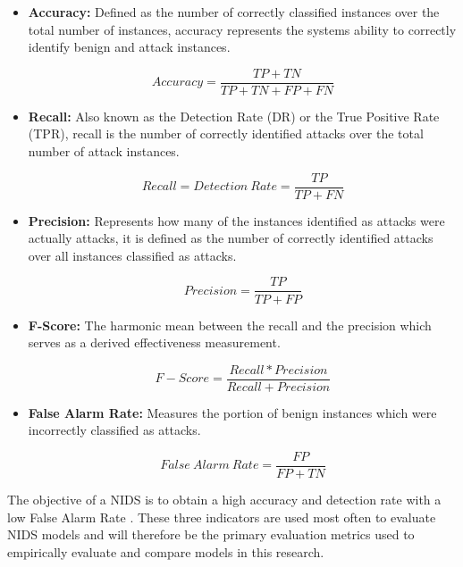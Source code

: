 \documentclass[conference]{IEEEtran}
\begin{document}
\begin{itemize}
    \item \textbf{Accuracy:} Defined as the number of correctly classified instances over the total number of instances, accuracy represents the systems ability to correctly identify benign and attack instances. 
    
    \begin{equation}\label{eq1}
        Accuracy= \frac{TP + TN}{TP + TN + FP + FN}
    \end{equation}
    
    \item \textbf{Recall:} Also known as the Detection Rate (DR) or the True Positive Rate (TPR), recall is the number of correctly identified attacks over the total number of attack instances.
    
    \begin{equation}\label{eq2}
        Recall = Detection\:Rate = \frac{TP}{TP + FN}
    \end{equation}
    
    \item \textbf{Precision:} Represents how many of the instances identified as attacks were actually attacks, it is defined as the number of correctly identified attacks over all instances classified as attacks.
    
    \begin{equation}\label{eq3}
        Precision =  \frac{TP}{TP + FP}
    \end{equation}
    
    \item \textbf{F-Score:} The harmonic mean between the recall and the precision which serves as a derived effectiveness measurement. 
    
    \begin{equation}\label{eq3}
        F-Score =  \frac{Recall * Precision}{Recall + Precision}
    \end{equation}
    
    \item \textbf{False Alarm Rate:} Measures the portion of benign instances which were incorrectly classified as attacks.
    
    \begin{equation}\label{eq3}
        False\:Alarm\:Rate =  \frac{FP}{FP+TN}
    \end{equation}
    
\end{itemize}

\noindent The objective of a NIDS is to obtain a high accuracy and detection rate with a low False Alarm Rate \citep{yin2017deep}. These three indicators are used most often to evaluate NIDS models \citep{ahmad2021network} and will therefore be the primary evaluation metrics used to empirically evaluate and compare models in this research.\\ 
\end{document}
